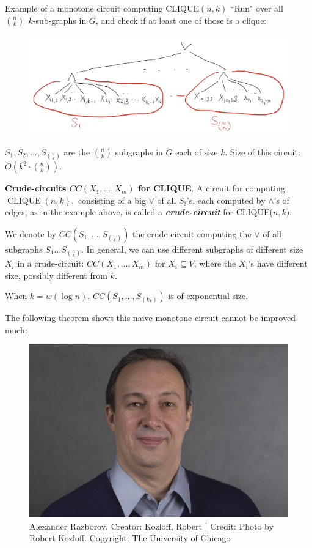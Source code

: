 \begin{trailer}{Example of a monotone circuit computing CLIQUE$(n, k)$}
 ``Run" over all $\binom{n}{k} ~~ k$-sub-graphs in $G$, and check if at least one of those is a clique:

\begin{figure}
    \centering
    \includegraphics[width=0.75\linewidth]{images/k-clique-simple-circuit.png}
    \label{fig:enter-label}
\end{figure}

$S_1, S_2, \ldots, S_{\binom{n}{k}}$ are the $\binom{n}{k}$ subgraphs in $G$ each of size $k$.
Size of this circuit: $O\left(k^2 \cdot\binom{n}{k}\right)$.

\end{trailer}


\begin{svgraybox}
\textbf{Crude-circuits $CC\left(X_1, \ldots, X_m\right)$ for CLIQUE}.
A  circuit for computing $\operatorname{CLIQUE}  (n, k),$ consisting of a big $\lor$ of all $S_i$'s, each computed by $\land$'s of edges, as in the example above, is called a \textbf{\textit{crude-circuit}} for CLIQUE($n, k)$.

We denote by $CC\left(S_1, \ldots, S_{\binom{n}{k}}\right)$  the crude circuit computing the $\lor$ of all subgraphs $S_1 \ldots S_{n\choose k }$. In general, we can use different subgraphs of different size $X_i$ in a crude-circuit: $CC\left(X_1, \ldots, X_m\right)$ for $X_i \subseteq V$, where the $X_i$'s have different size, possibly different from $k$.
\end{svgraybox}

\begin{note} When $k=w(\log n)$, $CC\left(S_1, \ldots, S_{\left(k_k\right)}\right)$ is of exponential size.
\end{note}

The following theorem shows this naive monotone circuit cannot be improved much:

\begin{figure}
    \centering
    \includegraphics[width=0.3\linewidth]{images/RAZBOROV_Alexander.jpeg}
    \caption{Alexander Razborov. Creator: Kozloff, Robert | Credit: Photo by Robert Kozloff.
Copyright: The University of Chicago}
    \label{fig:enter-label}
\end{figure}

